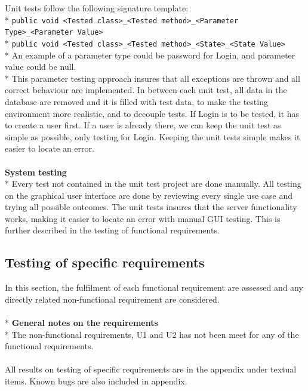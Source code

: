 \documentclass[a4paper,11pt,report]{article}
\begin{document}
{Unit tests follow the following signature template:
\\*
\verb|public void <Tested class>_<Tested method>_<Parameter Type>_<Parameter Value>|
\\*
\verb|public void <Tested class>_<Tested method>_<State>_<State Value>|
\\*
An example of a parameter type could be password for Login, and parameter value could be null. \\*
This parameter testing approach insures that all exceptions are thrown and all correct behaviour are implemented. In between each unit test, all data in the database are removed and it is filled with test data, to make the testing environment more realistic, and to decouple tests. If Login is to be tested, it has to create a user first. If a user is already there, we can keep the unit test as simple as possible, only testing for Login. Keeping the unit tests simple makes it easier to locate an error. \\ \\
\textbf{System testing}\\*
Every test not contained in the unit test project are done manually. All testing on the graphical user interface are done by reviewing every single use case and trying all possible outcomes. The unit tests insures that the server functionality works, making it easier to locate an error with manual GUI testing. This is further described in the testing of functional requirements.

\subsection{Testing of specific requirements}
In this section, the fulfilment of each functional requirement are assessed and any directly related non-functional requirement are considered. \\ \\*
\textbf{General notes on the requirements} \\*
The non-functional requirements, U1 and U2 has not been meet for any of the functional requirements. \\ \\
All results on testing of specific requirements are in the appendix under textual items. Known bugs are also included in appendix.

}
\end{document}
